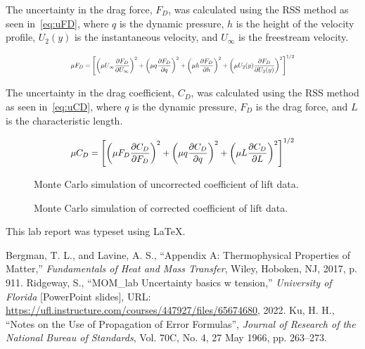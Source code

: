 \documentclass[journal,letterpaper]{IEEEtran}
\begin{document}
The uncertainty in the drag force, $F_D$, was calculated using the RSS method as seen in~\eqref{eq:uFD}, where $q$ is the dynamic pressure, $h$ is the height of the velocity profile, $U_2 (y)$ is the instantaneous velocity, and $U_\infty$ is the freestream velocity.

\begin{equation} \label{eq:uFD}
    \resizebox{227pt}{!}{$\displaystyle{\mu F_D = \left[\left(\mu U_\infty \frac{\partial F_D}{\partial U_\infty}\right)^2 + \left(\mu q \frac{\partial F_D}{\partial q}\right)^2 + \left(\mu h \frac{\partial F_D}{\partial h}\right)^2 + \left(\mu U_2 (y) \frac{\partial F_D}{\partial U_2 (y)}\right)^2\right]^{1/2}}$}
\end{equation}

The uncertainty in the drag coefficient, $C_D$, was calculated using the RSS method as seen in~\eqref{eq:uCD}, where $q$ is the dynamic pressure, $F_D$ is the drag force, and $L$ is the characteristic length.

\begin{equation} \label{eq:uCD}
    \resizebox{227pt}{!}{$\displaystyle{\mu C_D = \left[\left(\mu F_D \frac{\partial C_D}{\partial F_D}\right)^2 + \left(\mu q \frac{\partial C_D}{\partial q}\right)^2 + \left(\mu L \frac{\partial C_D}{\partial L}\right)^2\right]^{1/2}}$}
\end{equation}

\begin{figure}[H]
    \centering
    
    \caption{Monte Carlo simulation of uncorrected coefficient of lift data.}
    \label{fig:Incorrect}
\end{figure}

\begin{figure}[H]
    \centering
    
    \caption{Monte Carlo simulation of corrected coefficient of lift data.}
    \label{fig:Correct}
\end{figure}

\noindent
This lab report was typeset using \LaTeX.

\begin{thebibliography}{99}
     Bergman, T. L., and Lavine, A. S., ``Appendix A: Thermophysical Properties of Matter,'' \textit{Fundamentals of Heat and Mass Transfer}, Wiley, Hoboken, NJ, 2017, p. 911.
     Ridgeway, S., ``MOM\_lab Uncertainty basics w tension,'' \textit{University of Florida} [PowerPoint slides], URL: \url{https://ufl.instructure.com/courses/447927/files/65674680}, 2022.
     Ku, H. H., ``Notes on the Use of Propagation of Error Formulas'', \textit{Journal of Research of the National Bureau of Standards}, Vol. 70C, No. 4, 27 May 1966, pp. 263--273.
\end{thebibliography}
\end{document}
